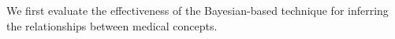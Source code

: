 \documentclass[1p]{elsarticle}
\begin{document}
We first evaluate the effectiveness of the Bayesian-based technique for inferring the relationships between medical concepts. 
%
\end{document}
